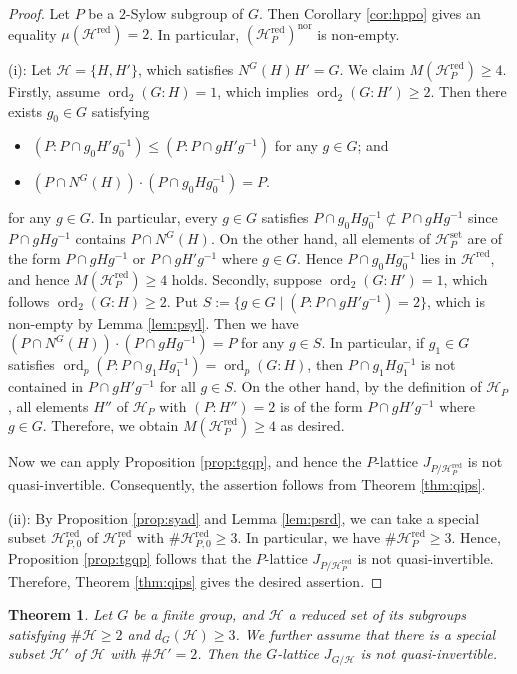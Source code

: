 \documentclass[12pt]{amsart}
\theoremstyle{plain}
\newtheorem{thm}{Theorem}[section]
\theoremstyle{definition}
\numberwithin{thm}{section}
\numberwithin{equation}{section}
\newcommand{\cH}{\mathcal{H}}
\DeclareMathOperator{\ord}{ord}
\DeclareMathOperator{\red}{red}
\DeclareMathOperator{\nor}{nor}
\DeclareMathOperator{\set}{set}
\begin{document}
\begin{proof}
Let $P$ be a $2$-Sylow subgroup of $G$. Then Corollary \ref{cor:hppo} gives an equality $\mu(\cH^{\red})=2$. In particular, $(\cH_{P}^{\red})^{\nor}$ is non-empty. 

(i): Let $\cH=\{H,H'\}$, which satisfies $N^{G}(H)H'=G$. We claim $M(\cH_{P}^{\red})\geq 4$. Firstly, assume $\ord_{2}(G:H)=1$, which implies $\ord_{2}(G:H')\geq 2$. Then there exists $g_{0}\in G$ satisfying
\begin{itemize}
\item $(P:P\cap g_{0}H'g_{0}^{-1})\leq (P:P\cap gH'g^{-1})$ for any $g\in G$; and 
\item $(P\cap N^{G}(H))\cdot (P\cap g_{0}Hg_{0}^{-1})=P$. 
\end{itemize}
for any $g\in G$. In particular, every $g\in G$ satisfies $P\cap g_{0}Hg_{0}^{-1}\not\subset P\cap gHg^{-1}$ since $P\cap gHg^{-1}$ contains $P\cap N^{G}(H)$. On the other hand, all elements of $\cH_{P}^{\set}$ are of the form $P\cap gHg^{-1}$ or $P\cap gH'g^{-1}$ where $g\in G$. Hence $P\cap g_{0}Hg_{0}^{-1}$ lies in $\cH^{\red}$, and hence $M(\cH_{P}^{\red})\geq 4$ holds. Secondly, suppose $\ord_{2}(G:H')=1$, which follows $\ord_{2}(G:H)\geq 2$. Put $S:=\{g\in G\mid (P:P\cap gH'g^{-1})=2\}$, which is non-empty by Lemma \ref{lem:psyl}. Then we have $(P\cap N^{G}(H))\cdot (P\cap gHg^{-1})=P$ for any $g\in S$. In particular, if $g_{1}\in G$ satisfies $\ord_{p}(P:P\cap g_{1}Hg_{1}^{-1})=\ord_{p}(G:H)$, then $P\cap g_{1}Hg_{1}^{-1}$ is not contained in $P\cap gH'g^{-1}$ for all $g\in S$. On the other hand, by the definition of $\cH_{P}$, all elements $H''$ of $\cH_{P}$ with $(P:H'')=2$ is of the form $P\cap gH'g^{-1}$ where $g\in G$. Therefore, we obtain $M(\cH_{P}^{\red})\geq 4$ as desired. 

Now we can apply Proposition \ref{prop:tgqp}, and hence the $P$-lattice $J_{P/\cH_{P}^{\red}}$ is not quasi-invertible. Consequently, the assertion follows from Theorem \ref{thm:qips}. 

(ii): By Proposition \ref{prop:syad} and Lemma \ref{lem:psrd}, we can take a special subset $\cH_{P,0}^{\red}$ of $\cH_{P}^{\red}$ with $\#\cH_{P,0}^{\red}\geq 3$. In particular, we have $\#\cH_{P}^{\red}\geq 3$. Hence, Proposition \ref{prop:tgqp} follows that the $P$-lattice $J_{P/\cH_{P}^{\red}}$ is not quasi-invertible. Therefore, Theorem \ref{thm:qips} gives the desired assertion. 
\end{proof}

\begin{thm}\label{thm:gcdb}
Let $G$ be a finite group, and $\cH$ a reduced set of its subgroups satisfying $\#\cH \geq 2$ and $d_{G}(\cH)\geq 3$. We further assume that there is a special subset $\cH'$ of $\cH$ with $\#\cH'=2$. Then the $G$-lattice $J_{G/\cH}$ is not quasi-invertible. 
\end{thm}
\end{document}
